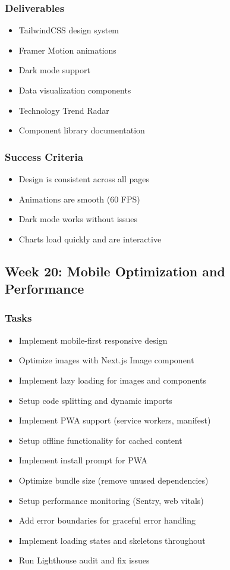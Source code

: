 \documentclass[12pt,oneside]{report}
\begin{document}
\subsubsection{Deliverables}

\begin{itemize}
    \item TailwindCSS design system
    \item Framer Motion animations
    \item Dark mode support
    \item Data visualization components
    \item Technology Trend Radar
    \item Component library documentation
\end{itemize}

\subsubsection{Success Criteria}

\begin{itemize}
    \item Design is consistent across all pages
    \item Animations are smooth (60 FPS)
    \item Dark mode works without issues
    \item Charts load quickly and are interactive
\end{itemize}

\subsection{Week 20: Mobile Optimization and Performance}

\subsubsection{Tasks}

\begin{itemize}
    \item Implement mobile-first responsive design
    \item Optimize images with Next.js Image component
    \item Implement lazy loading for images and components
    \item Setup code splitting and dynamic imports
    \item Implement PWA support (service workers, manifest)
    \item Setup offline functionality for cached content
    \item Implement install prompt for PWA
    \item Optimize bundle size (remove unused dependencies)
    \item Setup performance monitoring (Sentry, web vitals)
    \item Add error boundaries for graceful error handling
    \item Implement loading states and skeletons throughout
    \item Run Lighthouse audit and fix issues
\end{itemize}
\end{document}
